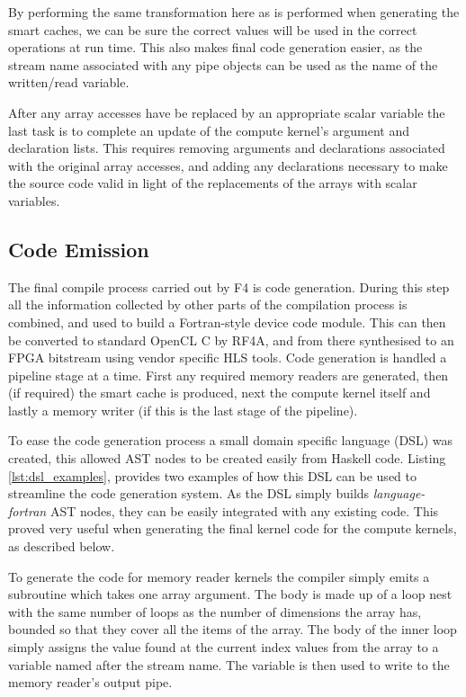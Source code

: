 \documentclass{mpaper}
\begin{document}
By performing the same transformation here as is performed when generating the smart caches, we can be sure the correct values will be used in the correct operations at run time. 
This also makes final code generation easier, as the stream name associated with any pipe objects can be used as the name of the written/read variable.

After any array accesses have be replaced by an appropriate scalar variable the last task is to complete an update of the compute kernel's argument and declaration lists.
This requires removing arguments and declarations associated with the original array accesses, and adding any declarations necessary to make the source code valid in light of the replacements of the arrays with scalar variables.  


\subsection{Code Emission}

The final compile process carried out by F4 is code generation.
During this step all the information collected by other parts of the compilation process is combined, and used to build a Fortran-style device code module.
This can then be converted to standard OpenCL C by RF4A, and from there synthesised to an FPGA bitstream using vendor specific HLS tools.
Code generation is handled a pipeline stage at a time.
First any required memory readers are generated, then (if required) the smart cache is produced, next the compute kernel itself and lastly a memory writer (if this is the last stage of the pipeline).

To ease the code generation process a small domain specific language (DSL) was created, this allowed AST nodes to be created easily from Haskell code.
Listing \ref{lst:dsl_examples}, provides two examples of how this DSL can be used to streamline the code generation system.
As the DSL simply builds \textit{language-fortran} AST nodes, they can be easily integrated with any existing code.
This proved very useful when generating the final kernel code for the compute kernels, as described below.


To generate the code for memory reader kernels the compiler simply emits a subroutine which takes one array argument.
The body is made up of a loop nest with the same number of loops as the number of dimensions the array has, bounded so that they cover all the items of the array. 
The body of the inner loop simply assigns the value found at the current index values from the array to a variable named after the stream name. 
The variable is then used to write to the memory reader's output pipe.
\end{document}
